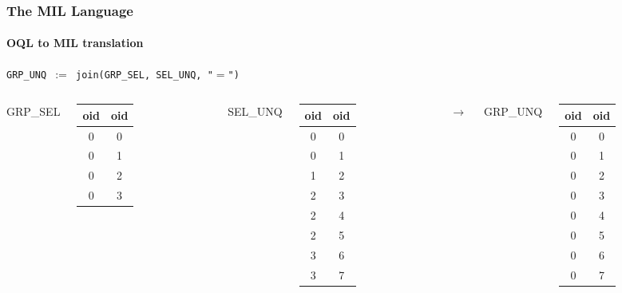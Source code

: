 \documentclass{beamer}
\begin{document}
\begin{frame}
  \frametitle{The MIL Language}
  \framesubtitle{OQL to MIL translation}

  \begin{block}{}
  {\tt GRP\_UNQ $:=$ join(GRP\_SEL, SEL\_UNQ, "$=$")}
  \end{block}

  \begin{columns}

  \column{2cm}

  GRP\_SEL
  \begin{tabular}{|c|c|}
    \hline
    oid & oid \\
    \hline
    0 & 0 \\
    0 & 1 \\
    0 & 2 \\
    0 & 3 \\
    \hline
  \end{tabular}

  \column{1.5cm}

  SEL\_UNQ
  \begin{tabular}{|c|c|}
    \hline
    oid & oid \\
    \hline
    0 & 0 \\
    0 & 1 \\
    1 & 2 \\
    2 & 3 \\
    2 & 4 \\
    2 & 5 \\
    3 & 6 \\
    3 & 7 \\
    \hline
  \end{tabular}

  \column{0.5cm}

  $\longrightarrow$

  \column{1cm}

  GRP\_UNQ
  \begin{tabular}{|c|c|}
    \hline
    oid & oid \\
    \hline
    0 & 0 \\
    0 & 1 \\
    0 & 2 \\
    0 & 3 \\
    0 & 4 \\
    0 & 5 \\
    0 & 6 \\
    0 & 7 \\
    \hline
  \end{tabular}

  \end{columns}

\end{frame}
\end{document}
